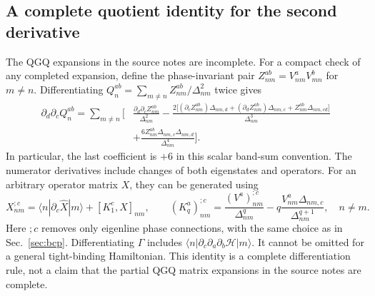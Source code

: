 \documentclass[prx,amsmath,amssymb,superscriptaddress,longbibliography]{revtex4-2}
\begin{document}
\subsection{A complete quotient identity for the second derivative}
The QGQ expansions in the source notes are incomplete.
For a compact check of any completed expansion, define the phase-invariant pair
$Z_{nm}^{ab}=V_{nm}^aV_{mn}^b$ for $m\ne n$.
Differentiating $Q_n^{ab}=\sum_{m\ne n}Z_{nm}^{ab}/\Delta_{nm}^2$ twice gives
\begin{align}
 \partial_d\partial_c Q_n^{ab}=\sum_{m\ne n}\bigg[
 &\frac{\partial_d\partial_c Z_{nm}^{ab}}{\Delta_{nm}^2}
 -\frac{2\big[(\partial_c Z_{nm}^{ab})\Delta_{nm,d}
              +(\partial_d Z_{nm}^{ab})\Delta_{nm,c}
              +Z_{nm}^{ab}\Delta_{nm,cd}\big]}{\Delta_{nm}^3}
 \nonumber\\
 &+\frac{6Z_{nm}^{ab}\Delta_{nm,c}\Delta_{nm,d}}{\Delta_{nm}^4}\bigg].
 \label{eq:qgq-quotient}
\end{align}
In particular, the last coefficient is $+6$ in this scalar band-sum convention.
The numerator derivatives include changes of both eigenstates and operators.
For an arbitrary operator matrix $X$, they can be generated using
\begin{equation}
 X_{nm}^{;c}=\langle n|\partial_c\hat X|m\rangle+[K_1^c,X]_{nm},\qquad
 (K_q^a)_{nm}^{;c}=\frac{(V^a)_{nm}^{;c}}{\Delta_{nm}^q}
 -q\frac{V_{nm}^a\Delta_{nm,c}}{\Delta_{nm}^{q+1}},\quad n\ne m.
 \label{eq:qgd-recursion}
\end{equation}
Here $;c$ removes only eigenline phase connections, with the same choice as in
Sec.~\ref{sec:bcp}. Differentiating $\Gamma$ includes
$\langle n|\partial_c\partial_a\partial_b\mathcal H|m\rangle$.
It cannot be omitted for a general tight-binding Hamiltonian.
This identity is a complete differentiation rule, not a claim that the
partial QGQ matrix expansions in the source notes are complete.
\end{document}
